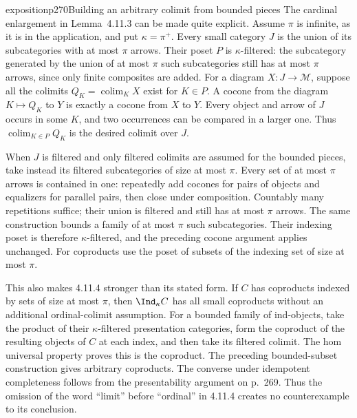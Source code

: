 \begin{dcomment}{exposition}{p270}{Building an arbitrary colimit from bounded pieces}
The cardinal enlargement in Lemma~4.11.3 can be made quite explicit. Assume $\pi$ is infinite, as it is in the application, and put $\kappa=\pi^+$. Every small category $J$ is the union of its subcategories with at most $\pi$ arrows. Their poset $P$ is $\kappa$-filtered: the subcategory generated by the union of at most $\pi$ such subcategories still has at most $\pi$ arrows, since only finite composites are added. For a diagram $X:J\to\mathcal M$, suppose all the colimits $Q_K=\operatorname{colim}_{K}X$ exist for $K\in P$. A cocone from the diagram $K\mapsto Q_K$ to $Y$ is exactly a cocone from $X$ to $Y$. Every object and arrow of $J$ occurs in some $K$, and two occurrences can be compared in a larger one. Thus $\operatorname{colim}_{K\in P}Q_K$ is the desired colimit over $J$.

When $J$ is filtered and only filtered colimits are assumed for the bounded pieces, take instead its filtered subcategories of size at most $\pi$. Every set of at most $\pi$ arrows is contained in one: repeatedly add cocones for pairs of objects and equalizers for parallel pairs, then close under composition. Countably many repetitions suffice; their union is filtered and still has at most $\pi$ arrows. The same construction bounds a family of at most $\pi$ such subcategories. Their indexing poset is therefore $\kappa$-filtered, and the preceding cocone argument applies unchanged. For coproducts use the poset of subsets of the indexing set of size at most $\pi$.

This also makes 4.11.4 stronger than its stated form. If $C$ has coproducts indexed by sets of size at most $\pi$, then $\Ind_\kappa C$ has all small coproducts without an additional ordinal-colimit assumption. For a bounded family of ind-objects, take the product of their $\kappa$-filtered presentation categories, form the coproduct of the resulting objects of $C$ at each index, and then take its filtered colimit. The hom universal property proves this is the coproduct. The preceding bounded-subset construction gives arbitrary coproducts. The converse under idempotent completeness follows from the presentability argument on p.~269. Thus the omission of the word ``limit'' before ``ordinal'' in 4.11.4 creates no counterexample to its conclusion.
\end{dcomment}

